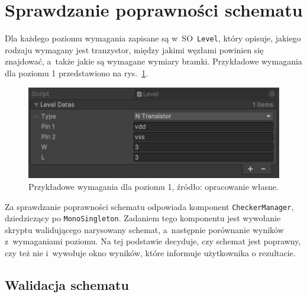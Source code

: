 \section{Sprawdzanie poprawności schematu}
\label{sec:sprawdzanie_poprawnosci_schematu}

Dla każdego poziomu wymagania zapisane są w~SO~\texttt{Level}, który opisuje,
jakiego rodzaju wymagany jest tranzystor,
między jakimi węzłami powinien się znajdować,
a~także jakie są wymagane wymiary bramki.
Przykładowe wymagania dla poziomu 1 przedstawiono na rys.~\ref{fig:level1_requirements}.

\begin{figure}[h]
    \centering
    \includegraphics[width=.9\textwidth]{chapters/chapter4/rys/level}
    \caption[Przykładowe wymagania dla poziomu 1.]
    {Przykładowe wymagania dla poziomu 1, źródło: opracowanie własne.}
    \label{fig:level1_requirements}
\end{figure}

Za sprawdzanie poprawności schematu odpowiada komponent \texttt{CheckerManager}, dziedziczący po \texttt{MonoSingleton}.
Zadaniem tego komponentu jest wywołanie skryptu walidującego narysowany schemat,
a~następnie porównanie wyników z~wymaganiami poziomu.
Na tej podstawie decyduje, czy schemat jest poprawny, czy też nie
i~wywołuje okno wyników, które informuje użytkownika o rezultacie.

\subsection{Walidacja schematu}
\label{subsec:walidacja_schematu}

